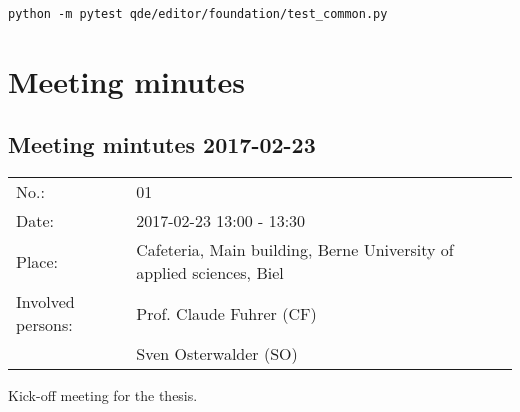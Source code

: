 \documentclass[10pt, openright, notitlepage]{scrreprt}
\begin{document}
\begin{verbatim}
python -m pytest qde/editor/foundation/test_common.py
\end{verbatim}


\section{Meeting minutes}
\label{sec:org5cf2c71}

\subsection{Meeting mintutes 2017-02-23}
\label{sec:org6be7799}

\begin{center}
\begin{tabular}{ll}
No.: & 01\\
Date: & 2017-02-23 13:00 - 13:30\\
Place: & Cafeteria, Main building, Berne University of applied sciences, Biel\\
Involved persons: & Prof. Claude Fuhrer (CF)\\
 & Sven Osterwalder (SO)\\
\end{tabular}
\end{center}

Kick-off meeting for the thesis.
\end{document}
